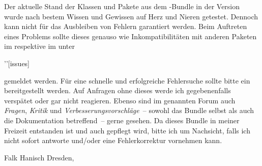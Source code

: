 Der aktuelle Stand der Klassen und Pakete aus dem \TUDScript-Bundle in der 
Version~\vTUDScript{} wurde nach bestem Wissen und Gewissen auf Herz und Nieren 
getestet. Dennoch kann nicht für das Ausbleiben von Fehlern garantiert werden. 
Beim Auftreten eines Problems sollte dieses genauso wie Inkompatibilitäten mit 
anderen Paketen im \Forum* respektive im \GitHubRepo*[issues] unter
\begin{quoting}
\Forum'\newline\GitHubRepo'[issues]%
\end{quoting}
gemeldet werden. Für eine schnelle und erfolgreiche Fehlersuche sollte bitte 
ein  
bereitgestellt werden. Auf Anfragen ohne dieses werde ich gegebenenfalls 
verspätet oder gar nicht reagieren. Ebenso sind im genannten Forum auch 
\emph{Fragen}, \emph{Kritik} und \emph{Verbesserungsvorschläge}~-- sowohl das 
Bundle selbst als auch die Dokumentation betreffend~-- gerne gesehen. Da dieses 
Bundle in meiner Freizeit entstanden ist und auch gepflegt wird, bitte ich um 
Nachsicht, falls ich nicht sofort antworte und/oder eine Fehlerkorrektur 
vornehmen kann.

\makeatletter
\medskip
\noindent Falk Hanisch\newline
Dresden, \@date
\makeatother
